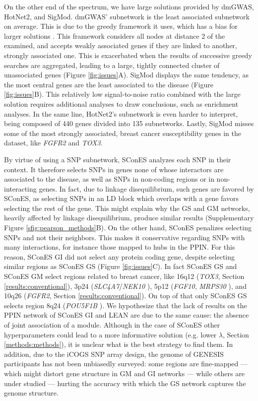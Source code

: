\documentclass[twocolumn, 10pt]{article}
\begin{document}
On the other end of the spectrum, we have large solutions provided by dmGWAS, HotNet2, and SigMod. dmGWAS' subnetwork is the least associated subnetwork on average. This is due to the greedy framework it uses, which has a bias for larger solutions \cite{nikolayeva_network_2018}. This framework considers all nodes at distance 2 of the examined, and accepts weakly associated genes if they are linked to another, strongly associated one. This is exacerbated when the results of successive greedy searches are aggregated, leading to a large, tightly connected cluster of unassociated genes (Figure \ref{fig:issues}A). SigMod displays the same tendency, as the most central genes are the least associated to the disease (Figure \ref{fig:issues}B). This relatively low signal-to-noise ratio combined with the large solution requires additional analyses to draw conclusions, such as enrichment analyses. In the same line, HotNet2's subnetwork is even harder to interpret, being composed of 440 genes divided into 135 subnetworks. Lastly, SigMod misses some of the most strongly associated, breast cancer susceptibility genes in the dataset, like \emph{FGFR2} and \emph{TOX3}.

By virtue of using a SNP subnetwork, SConES analyzes each SNP in their context. It therefore selects SNPs in genes none of whose interactors are associated to the disease, as well as SNPs in non-coding regions or in non-interacting genes. In fact, due to linkage disequilibrium, such genes are favored by SConES, as selecting SNPs in an LD block which overlaps with a gene favors selecting the rest of the gene. This might explain why the GS and GM networks, heavily affected by linkage disequilibrium, produce similar results (Supplementary Figure \ref{sfig:pearson_methods}B). On the other hand, SConES penalizes selecting SNPs and not their neighbors. This makes it conservative regarding SNPs with many interactions, for instance those mapped to hubs in the PPIN. For this reason, SConES GI did not select any protein coding gene, despite selecting similar regions as SConES GS (Figure \ref{fig:issues}C). In fact SConES GS and SConES GM select regions related to breast cancer, like 16q12 (\emph{TOX3}, Section \ref{results:conventional}), 3p24 (\emph{SLC4A7}/\emph{NEK10} \cite{ahmed_newly_2009}), 5p12 (\emph{FGF10}, \emph{MRPS30} \cite{quigley_5p12_2014}), and 10q26 (\emph{FGFR2}, Section \ref{results:conventional}). On top of that only SConES GS selects region 8q24 (\emph{POU5F1B} \cite{breyer_expressed_2014}). We hypothesize that the lack of results on the PPIN network of SConES GI and LEAN are due to the same cause: the absence of joint association of a module. Although in the case of SConES other hyperparameters could lead to a more informative solution (e.g. lower \(\lambda\), Section \ref{methods:methods}), it is unclear what is the best strategy to find them. In addition, due to the iCOGS SNP array design, the genome of GENESIS participants has not been unbiasedly surveyed: some regions are fine-mapped --- which might distort gene structure in GM and GI networks --- while others are under studied --- hurting the accuracy with which the GS network captures the genome structure.
\end{document}
